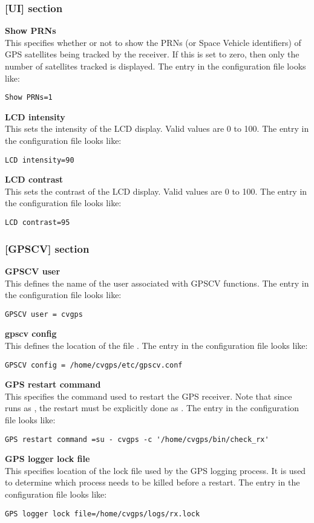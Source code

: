 \subsubsection{[UI] section}
{\bfseries Show PRNs}\\
This specifies whether or not to show the PRNs (or Space Vehicle identifiers) of
GPS satellites being tracked by the receiver. If this is set to zero, then only
the number of satellites tracked is displayed.
The entry in the configuration file looks like:
\begin{lstlisting}
Show PRNs=1
\end{lstlisting}
{\bfseries LCD intensity}\\
This sets the intensity of the LCD display. Valid values are 0 to 100.
The entry in the configuration file looks like:
\begin{lstlisting}
LCD intensity=90
\end{lstlisting}
{\bfseries LCD contrast}\\
This sets the contrast of the LCD display. Valid values are 0 to 100.
The entry in the configuration file looks like:
\begin{lstlisting}
LCD contrast=95
\end{lstlisting}

\subsubsection{[GPSCV] section}
{\bfseries GPSCV user}\\
This  defines the name of the user associated with GPSCV functions.
The entry in the configuration file looks like:
\begin{lstlisting}
GPSCV user = cvgps
\end{lstlisting}
{\bfseries gpscv config}\\
This defines the location of the file .
The entry in the configuration file looks like:
\begin{lstlisting}
GPSCV config = /home/cvgps/etc/gpscv.conf
\end{lstlisting}
{\bfseries GPS restart command}\\
This specifies the command used to restart the GPS receiver. Note that since
 runs as , the restart must be explicitly done
as .
The entry in the configuration file looks like:
\begin{lstlisting}
GPS restart command =su - cvgps -c '/home/cvgps/bin/check_rx'
\end{lstlisting}
{\bfseries GPS logger lock file}\\
This specifies location of the lock file used by the GPS logging process. It is
used to determine which process needs to be killed before a restart.
The entry in the configuration file looks like:
\begin{lstlisting}
GPS logger lock file=/home/cvgps/logs/rx.lock
\end{lstlisting}

